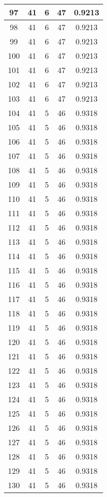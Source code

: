 \documentclass[letterpaper, 12pt]{article}
\begin{document}
\begin{longtable}{|c|c|c|c|c|}
\hline
97 & 41 & 6 & 47 & 0.9213 \\
\hline
98 & 41 & 6 & 47 & 0.9213 \\
\hline
99 & 41 & 6 & 47 & 0.9213 \\
\hline
100 & 41 & 6 & 47 & 0.9213 \\
\hline
101 & 41 & 6 & 47 & 0.9213 \\
\hline
102 & 41 & 6 & 47 & 0.9213 \\
\hline
103 & 41 & 6 & 47 & 0.9213 \\
\hline
104 & 41 & 5 & 46 & 0.9318 \\
\hline
105 & 41 & 5 & 46 & 0.9318 \\
\hline
106 & 41 & 5 & 46 & 0.9318 \\
\hline
107 & 41 & 5 & 46 & 0.9318 \\
\hline
108 & 41 & 5 & 46 & 0.9318 \\
\hline
109 & 41 & 5 & 46 & 0.9318 \\
\hline
110 & 41 & 5 & 46 & 0.9318 \\
\hline
111 & 41 & 5 & 46 & 0.9318 \\
\hline
112 & 41 & 5 & 46 & 0.9318 \\
\hline
113 & 41 & 5 & 46 & 0.9318 \\
\hline
114 & 41 & 5 & 46 & 0.9318 \\
\hline
115 & 41 & 5 & 46 & 0.9318 \\
\hline
116 & 41 & 5 & 46 & 0.9318 \\
\hline
117 & 41 & 5 & 46 & 0.9318 \\
\hline
118 & 41 & 5 & 46 & 0.9318 \\
\hline
119 & 41 & 5 & 46 & 0.9318 \\
\hline
120 & 41 & 5 & 46 & 0.9318 \\
\hline
121 & 41 & 5 & 46 & 0.9318 \\
\hline
122 & 41 & 5 & 46 & 0.9318 \\
\hline
123 & 41 & 5 & 46 & 0.9318 \\
\hline
124 & 41 & 5 & 46 & 0.9318 \\
\hline
125 & 41 & 5 & 46 & 0.9318 \\
\hline
126 & 41 & 5 & 46 & 0.9318 \\
\hline
127 & 41 & 5 & 46 & 0.9318 \\
\hline
128 & 41 & 5 & 46 & 0.9318 \\
\hline
129 & 41 & 5 & 46 & 0.9318 \\
\hline
130 & 41 & 5 & 46 & 0.9318 \\

\end{longtable}
\end{document}

